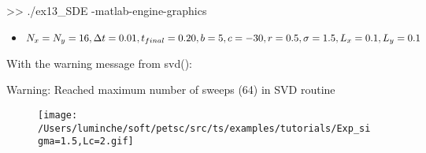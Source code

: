 \documentclass[
]{article}
\newenvironment{Shaded}{}{}
\newcommand{\NormalTok}[1]{#1}
\begin{document}
\begin{Shaded}
\begin{Highlighting}[]
\NormalTok{>> ./ex13_SDE -matlab-engine-graphics}
\end{Highlighting}
\end{Shaded}

\begin{itemize}
\item
  \(N_x=N_y=16, \Delta t=0.01, t_{final}=0.20,\\b=5,c=-30,r=0.5,\\\sigma=1.5,L_{x}=0.1,L_{y}=0.1\)
\end{itemize}

With the warning message from svd():

Warning: Reached maximum number of sweeps (64) in SVD routine

\begin{figure}
\centering
\texttt{[image: /Users/luminche/soft/petsc/src/ts/examples/tutorials/Exp\_sigma=1.5,Lc=2.gif]}
\caption{}
\end{figure}
\end{document}
